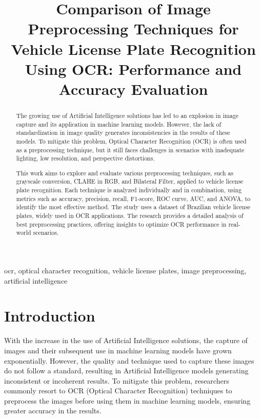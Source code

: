 \documentclass[conference]{IEEEtran}
\begin{document}
	
	\title{Comparison of Image Preprocessing Techniques for Vehicle License Plate Recognition Using OCR: Performance and Accuracy Evaluation}
	
	\author{
		
	}
	
	\maketitle
	
	\begin{abstract}
		The growing use of Artificial Intelligence solutions has led to an explosion in image capture and its application in machine learning models. However, the lack of standardization in image quality generates inconsistencies in the results of these models. To mitigate this problem, Optical Character Recognition (OCR) is often used as a preprocessing technique, but it still faces challenges in scenarios with inadequate lighting, low resolution, and perspective distortions.
		
		This work aims to explore and evaluate various preprocessing techniques, such as grayscale conversion, CLAHE in RGB, and Bilateral Filter, applied to vehicle license plate recognition. Each technique is analyzed individually and in combination, using metrics such as accuracy, precision, recall, F1-score, ROC curve, AUC, and ANOVA, to identify the most effective method. The study uses a dataset of Brazilian vehicle license plates, widely used in OCR applications. The research provides a detailed analysis of best preprocessing practices, offering insights to optimize OCR performance in real-world scenarios.
	\end{abstract}
	
	\begin{IEEEkeywords} 
		ocr, optical character recognition, vehicle license plates, image preprocessing, artificial intelligence
	\end{IEEEkeywords}
	
	\section{Introduction}
	With the increase in the use of Artificial Intelligence solutions, the capture of images and their subsequent use in machine learning models have grown exponentially. However, the quality and technique used to capture these images do not follow a standard, resulting in Artificial Intelligence models generating inconsistent or incoherent results. To mitigate this problem, researchers commonly resort to OCR (Optical Character Recognition) techniques to preprocess the images before using them in machine learning models, ensuring greater accuracy in the results.
	
\end{document}
